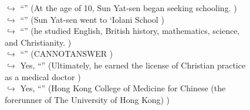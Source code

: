 \documentclass[11pt,a4paper, onecolumn]{article}
\begin{document}
\begin{figure}[t] \small \begin{tcolorbox}[boxsep=0pt,left=5pt,right=0pt,top=2pt,colback = yellow!5] \begin{dialogue}
 \small 
\colorbox{pink!25}{$\hookrightarrow$}
{ ``'' (At the age of 10, Sun Yat-sen began seeking schooling. ) }
\\
\colorbox{pink!25}{$\hookrightarrow$}
{ ``'' (Sun Yat-sen went to `Iolani School ) }
\\
\colorbox{pink!25}{$\hookrightarrow$}
{ ``'' (he studied English, British history, mathematics, science, and Christianity. ) }
\\
\colorbox{pink!25}{$\hookrightarrow$}
{ ``'' (CANNOTANSWER ) }
\\
\colorbox{pink!25}{$\hookrightarrow$}
\colorbox{red!25}{Yes,}
{ ``'' (Ultimately, he earned the license of Christian practice as a medical doctor ) }
\\
\colorbox{pink!25}{$\hookrightarrow$}
\colorbox{red!25}{Yes,}
{ ``'' (Hong Kong College of Medicine for Chinese (the forerunner of The University of Hong Kong) ) }
\\
 \end{dialogue}\end{tcolorbox}\end{figure}
\end{document}

